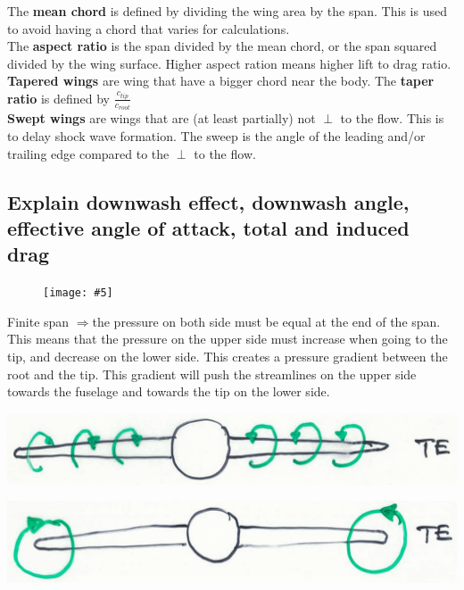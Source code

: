 \documentclass[british,french,11pt, a4paper, openany]{article}
\newcommand{\wrapfig}[6]{%
	\begin{figure}%
		\vspace{-5mm}%
		\texttt{[image: \#5]}%
		\captionof{figure}{}%
		\label{#6}%
	\end{figure}%
}
\begin{document}
The \textbf{mean chord} is defined by dividing the wing area by the span. This is used to avoid having a chord that varies for calculations.\\
The \textbf{aspect ratio} is the span divided  by the mean chord, or the span squared divided by the wing surface. Higher aspect ration means higher lift to drag ratio.\\
\textbf{Tapered wings} are wing that have a bigger chord near the body. The \textbf{taper ratio} is defined by $\frac{c_{tip}}{c_{root}}$\\
\textbf{Swept wings} are wings that are (at least partially) not $\perp$ to the flow. This is to delay shock wave formation. The sweep is the angle of the leading and/or trailing edge compared to the $\perp$ to the flow.

\subsection{Explain downwash effect, downwash angle, effective angle of attack, total and
	induced drag}
\wrapfig{7}{l}{6.5}{0.1}{ch3/3}{fig:3.3}
Finite span $\Rightarrow$the pressure on both side must be equal at the end of the span. This means that the pressure on the upper side must increase when going to the tip, and decrease on the lower side. This creates a pressure gradient between the root and the tip. This gradient will push the streamlines on the upper side towards the fuselage and towards the tip on the lower side. 

\begin{center}
	\begin{minipage}{0.4\textwidth}
		\includegraphics[scale=0.1]{ch3/4}
		\label{fig:3.4}
	\end{minipage}
	\begin{minipage}{0.4\textwidth}
		\includegraphics[scale=0.1]{ch3/5}
		\label{fig:3.5}
	\end{minipage}
\end{center}
\end{document}
